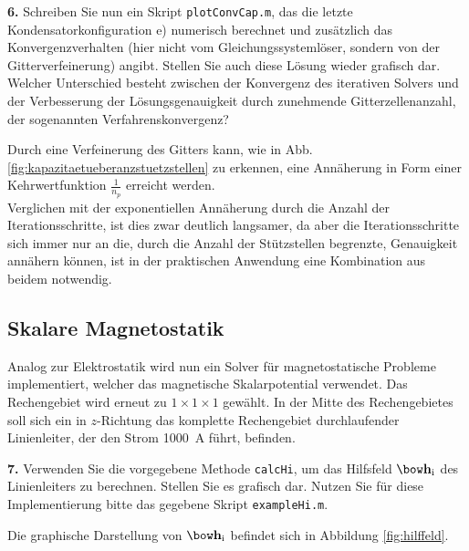 \documentclass[Protokollheft.tex]{subfiles}
\begin{document}
\begin{framed}
	\noindent \textbf{6.} Schreiben Sie nun ein Skript \lstinline{plotConvCap.m}, das die letzte Kondensatorkonfiguration e) numerisch berechnet
und zusätzlich das Konvergenzverhalten (hier nicht vom Gleichungssystemlöser, sondern von der Gitterverfeinerung)
angibt. Stellen Sie auch diese Lösung wieder grafisch dar.\\
Welcher Unterschied besteht zwischen der Konvergenz des iterativen Solvers und der Verbesserung der Lösungsgenauigkeit durch zunehmende Gitterzellenanzahl, der sogenannten Verfahrenskonvergenz?\label{exer:plotCapConvMesh}
\end{framed}
\noindent
Durch eine Verfeinerung des Gitters kann, wie in Abb. \ref{fig:kapazitaetueberanzstuetzstellen} zu erkennen, eine Annäherung in Form einer Kehrwertfunktion $\frac{1}{n_p}$ erreicht werden. \\
Verglichen mit der exponentiellen Annäherung durch die Anzahl der Iterationsschritte, ist dies zwar deutlich langsamer, da aber die Iterationsschritte sich immer nur an die, durch die Anzahl der Stützstellen begrenzte, Genauigkeit annähern können, ist in der praktischen Anwendung eine Kombination aus beidem notwendig. 

%
{\subsection{Skalare Magnetostatik}}
Analog zur Elektrostatik wird nun ein Solver für magnetostatische Probleme implementiert, welcher das magnetische Skalarpotential verwendet. Das Rechengebiet wird erneut zu $1\times 1\times 1$ gewählt. In der Mitte des Rechengebietes soll sich ein in $z$-Richtung das komplette Rechengebiet durchlaufender Linienleiter, der den Strom \SI{1000}{A} führt, befinden.

\begin{framed}
	\noindent \textbf{7.} Verwenden Sie die vorgegebene Methode \lstinline{calcHi}, um das Hilfsfeld $\hfit_{\text{i}}$ des Linienleiters zu berechnen.
Stellen Sie es grafisch dar. Nutzen Sie für diese Implementierung bitte das gegebene Skript \lstinline{exampleHi.m}.\label{exer:visualizeHi}
\end{framed}
\noindent
Die graphische Darstellung von $\hfit_{\text{i}}$ befindet sich in Abbildung \ref{fig:hilffeld}.
\end{document}
